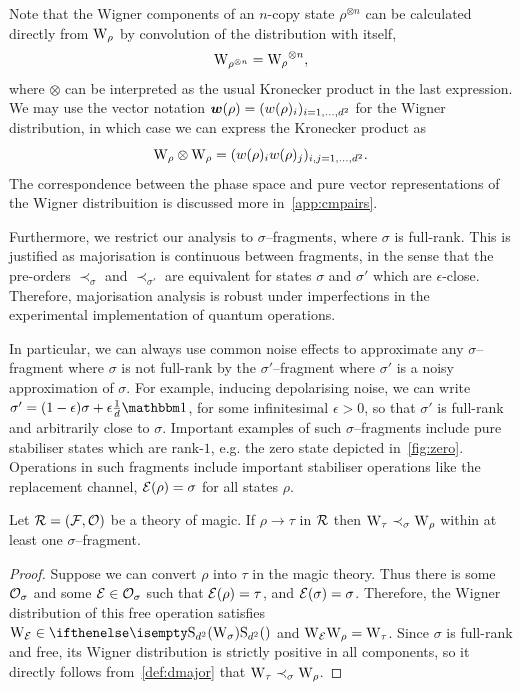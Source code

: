 \documentclass[pra,
aps,
twocolumn,
superscriptaddress,
groupedaddress,
nofootinbib,
reprint
]{revtex4-1}
\begin{document}
Note that the Wigner components of an $n$-copy state $\rho^{\otimes n}$ can be calculated directly from $\W{\rho}$ by convolution of the distribution with itself,
\begin{equation}
	\W{\rho^{\otimes n}} = \W{\rho}^{\otimes n},
\end{equation}
where $\otimes$ can be interpreted as the usual Kronecker product in the last expression.
We may use the vector notation $\bm{w}(\rho) = (w(\rho)_i)_{i=1,\dots,d^2}$ for the Wigner distribution, in which case we can express the Kronecker product as
\begin{equation}
	\W{\rho} \otimes \W{\rho} = (w(\rho)_i w(\rho)_j)_{i,j=1,\dots,d^2}.
\end{equation}
The correspondence between the phase space and pure vector representations of the Wigner distribuition is discussed more in~\cref{app:cmpairs}.

Furthermore, we restrict our analysis to $\sigma$--fragments, where $\sigma$ is full-rank.
This is justified as majorisation is continuous between fragments, in the sense that the pre-orders $\prec_\sigma$ and $\prec_{\sigma'}$ are equivalent for states $\sigma$ and $\sigma'$ which are $\epsilon$-close. 
Therefore, majorisation analysis is robust under imperfections in the experimental implementation of quantum operations.

In particular, we can always use common noise effects to approximate any $\sigma$--fragment where $\sigma$ is not full-rank by the $\sigma'$--fragment where $\sigma'$ is a noisy approximation of $\sigma$. 
For example, inducing depolarising noise, we can write $\sigma' = (1-\epsilon)\sigma + \epsilon\frac{1}{d}\id$, for some infinitesimal $\epsilon > 0$, so that $\sigma'$ is full-rank and arbitrarily close to $\sigma$.
Important examples of such $\sigma$--fragments include pure stabiliser states which are rank-$1$, e.g. the zero state depicted in~\cref{fig:zero}. 
Operations in such fragments include important stabiliser operations like the replacement channel, $\mathcal{E}(\rho) = \sigma$ for all states $\rho$.

\begin{theorem}\label{thm:sigmamajor}
    Let $\mathcal{R} = (\mathcal{F}, \mathcal{O})$ be a theory of magic. If $\rho \longrightarrow \tau$  in $\mathcal{R}$ then  $\W{\tau} \prec_\sigma \W{\rho}$ within at least one $\sigma$--fragment.
\end{theorem}
\begin{proof}
Suppose we can convert $\rho$ into $\tau$ in the magic theory. 
Thus there is some $\mathcal{O}_\sigma$ and some $\mathcal{E} \in \mathcal{O}_\sigma$ such that $\mathcal{E}(\rho) = \tau$, and $\mathcal{E}(\sigma)=\sigma$. 
Therefore, the Wigner distribution of this free operation satisfies $\W{\E} \in \stochw$ and $\W{\E}\W{\rho} = \W{\tau}$. 
Since $\sigma$ is full-rank and free, its Wigner distribution is strictly positive in all components, so it directly follows from~\cref{def:dmajor} that $\W{\tau} \prec_{\sigma} \W{\rho}$.
\end{proof}
\end{document}
